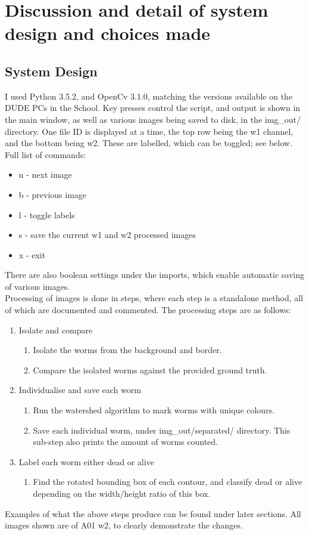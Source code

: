\documentclass[a4paper,12pt]{article}
\begin{document}
\section*{Discussion and detail of system design and choices made}
\subsection*{System Design}
I used Python 3.5.2, and OpenCv 3.1.0, matching the versions available on the DUDE PCs in the School.
Key presses control the script, and output is shown in the main window, as well as various images being saved to disk, in the img\_out/ directory.
One file ID is displayed at a time, the top row being the w1 channel, and the bottom being w2. These are labelled, which can be toggled; see below.
Full list of commands:
\begin{itemize}
    \item n - next image
    \item b - previous image
    \item l - toggle labels
    \item s - save the current w1 and w2 processed images
    \item x - exit
\end{itemize}
There are also boolean settings under the imports, which enable automatic saving of various images. \\
Processing of images is done in steps, where each step is a standalone method, all of which are documented and commented. The processing steps are as follows:
\begin{enumerate}
    \item Isolate and compare
    \begin{enumerate}
        \item Isolate the worms from the background and border.
        \item Compare the isolated worms against the provided ground truth.
    \end{enumerate}

    \item Individualise and save each worm
    \begin{enumerate}
        \item Run the watershed algorithm to mark worms with unique colours.
        \item Save each individual worm, under img\_out/separated/ directory. This sub-step also prints the amount of worms counted.
    \end{enumerate}

    \item Label each worm either dead or alive
    \begin{enumerate}
        \item Find the rotated bounding box of each contour, and classify dead or alive depending on the width/height ratio of this box.
    \end{enumerate}
\end{enumerate}
Examples of what the above steps produce can be found under later sections. All images shown are of A01 w2, to clearly demonstrate the changes.
\end{document}
